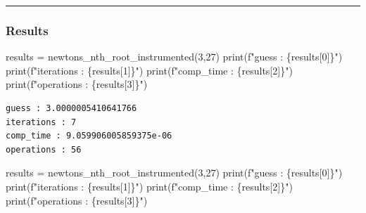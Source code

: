 \documentclass[
  letterpaper,
  DIV=11,
  numbers=noendperiod]{scrartcl}
\newenvironment{Shaded}{\begin{snugshade}}{\end{snugshade}}
\newcommand{\BuiltInTok}[1]{\textcolor[rgb]{0.00,0.23,0.31}{#1}}
\newcommand{\DecValTok}[1]{\textcolor[rgb]{0.68,0.00,0.00}{#1}}
\newcommand{\NormalTok}[1]{\textcolor[rgb]{0.00,0.23,0.31}{#1}}
\newcommand{\OperatorTok}[1]{\textcolor[rgb]{0.37,0.37,0.37}{#1}}
\newcommand{\SpecialCharTok}[1]{\textcolor[rgb]{0.37,0.37,0.37}{#1}}
\newcommand{\SpecialStringTok}[1]{\textcolor[rgb]{0.13,0.47,0.30}{#1}}
\begin{document}
\begin{center}\rule{0.5\linewidth}{0.5pt}\end{center}

\subsubsection{Results}\label{results}

\begin{Shaded}
\begin{Highlighting}[]
\NormalTok{results }\OperatorTok{=}\NormalTok{ newtons\_nth\_root\_instrumented(}\DecValTok{3}\NormalTok{,}\DecValTok{27}\NormalTok{)}
\BuiltInTok{print}\NormalTok{(}\SpecialStringTok{f"guess : }\SpecialCharTok{\{}\NormalTok{results[}\DecValTok{0}\NormalTok{]}\SpecialCharTok{\}}\SpecialStringTok{"}\NormalTok{)}
\BuiltInTok{print}\NormalTok{(}\SpecialStringTok{f"iterations : }\SpecialCharTok{\{}\NormalTok{results[}\DecValTok{1}\NormalTok{]}\SpecialCharTok{\}}\SpecialStringTok{"}\NormalTok{)}
\BuiltInTok{print}\NormalTok{(}\SpecialStringTok{f"comp\_time : }\SpecialCharTok{\{}\NormalTok{results[}\DecValTok{2}\NormalTok{]}\SpecialCharTok{\}}\SpecialStringTok{"}\NormalTok{)}
\BuiltInTok{print}\NormalTok{(}\SpecialStringTok{f"operations : }\SpecialCharTok{\{}\NormalTok{results[}\DecValTok{3}\NormalTok{]}\SpecialCharTok{\}}\SpecialStringTok{"}\NormalTok{)}
\end{Highlighting}
\end{Shaded}

\begin{verbatim}
guess : 3.0000005410641766
iterations : 7
comp_time : 9.059906005859375e-06
operations : 56
\end{verbatim}

\begin{Shaded}
\begin{Highlighting}[]
\NormalTok{results }\OperatorTok{=}\NormalTok{ newtons\_nth\_root\_instrumented(}\DecValTok{3}\NormalTok{,}\DecValTok{27}\NormalTok{)}
\BuiltInTok{print}\NormalTok{(}\SpecialStringTok{f"guess : }\SpecialCharTok{\{}\NormalTok{results[}\DecValTok{0}\NormalTok{]}\SpecialCharTok{\}}\SpecialStringTok{"}\NormalTok{)}
\BuiltInTok{print}\NormalTok{(}\SpecialStringTok{f"iterations : }\SpecialCharTok{\{}\NormalTok{results[}\DecValTok{1}\NormalTok{]}\SpecialCharTok{\}}\SpecialStringTok{"}\NormalTok{)}
\BuiltInTok{print}\NormalTok{(}\SpecialStringTok{f"comp\_time : }\SpecialCharTok{\{}\NormalTok{results[}\DecValTok{2}\NormalTok{]}\SpecialCharTok{\}}\SpecialStringTok{"}\NormalTok{)}
\BuiltInTok{print}\NormalTok{(}\SpecialStringTok{f"operations : }\SpecialCharTok{\{}\NormalTok{results[}\DecValTok{3}\NormalTok{]}\SpecialCharTok{\}}\SpecialStringTok{"}\NormalTok{)}
\end{Highlighting}
\end{Shaded}
\end{document}
